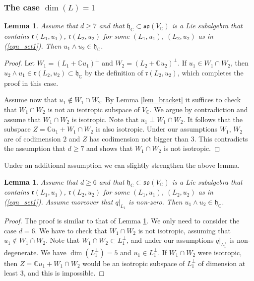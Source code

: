 \documentclass[11pt]{article}
\newcommand{\6}{\partial}
\newcommand{\bbC}{\mathbb{C}}
\newcommand{\frh}{\mathfrak{h}}
\newcommand{\frr}{\mathfrak{r}}
\newcommand{\frso}{\mathfrak{so}}
\renewcommand{\ge}{\geqslant}
\newcommand{\wdg}{\wedge}
\newtheorem{lem}[defn]{Lemma}
\begin{document}
\subsubsection{The case $\dim(L) = 1$}

\begin{lem}\label{lem_dim1}
Assume that $d\ge 7$ and that $\frh_\bbC\subset\frso(V_\bbC)$ is a Lie subalgebra
that contains $\frr(L_1,u_1)$, $\frr(L_2,u_2)$ for some $(L_1,u_1)$, $(L_2,u_2)$
as in (\ref{eqn_set1}). Then $u_1\wdg u_2\in \frh_\bbC$.
\end{lem}
\begin{proof}
Let $W_1 = (L_1 + \bbC u_1)^\perp$ and $W_2 = (L_2 + \bbC u_2)^\perp$.
If $u_1\in W_1\cap W_2$, then $u_2\wdg u_1\in \frr(L_2,u_2)\subset \frh_\bbC$
by the definition of $\frr(L_2,u_2)$, which completes the proof in this case.

Assume now that $u_1\notin W_1\cap W_2$. By Lemma \ref{lem_bracket} it suffices
to check that $W_1\cap W_2$ is not an isotropic subspace of $V_\bbC$.
We argue by contradiction and assume that $W_1\cap W_2$ is isotropic.
Note that $u_1 \perp W_1\cap W_2$. It follows that the subspace $Z = \bbC u_1 + W_1\cap W_2$
is also isotropic. Under our assumptions $W_1$, $W_2$ are of codimension $2$ and $Z$ has codimension
not bigger than $3$. This contradicts the assumption that $d\ge 7$ and
shows that $W_1\cap W_2$ is not isotropic.
\end{proof}

Under an additional assumption we can slightly strengthen the above lemma.

\begin{lem}\label{lem_dim1_strong}
Assume that $d\ge 6$ and that $\frh_\bbC\subset\frso(V_\bbC)$ is a Lie subalgebra
that contains $\frr(L_1,u_1)$, $\frr(L_2,u_2)$ for some $(L_1,u_1)$, $(L_2,u_2)$
as in (\ref{eqn_set1}). Assume moreover that $q|_{L_1}$ is non-zero. Then $u_1\wdg u_2\in \frh_\bbC$.
\end{lem}
\begin{proof} The proof is similar to that of Lemma \ref{lem_dim1}. We only need to consider
the case $d = 6$. We have to check that $W_1\cap W_2$ is not isotropic, assuming that $u_1\notin W_1\cap W_2$.
Note that $W_1\cap W_2\subset L_1^\perp$, and under our assumptions $q|_{L_1^\perp}$ is
non-degenerate. We have $\dim(L_1^\perp) = 5$ and $u_1\in L_1^\perp$. If $W_1\cap W_2$ were isotropic,
then $Z = \bbC u_1 + W_1\cap W_2$ would be an isotropic subspace of $L_1^\perp$ of dimension at least 3,
and this is impossible.
\end{proof}
\end{document}
